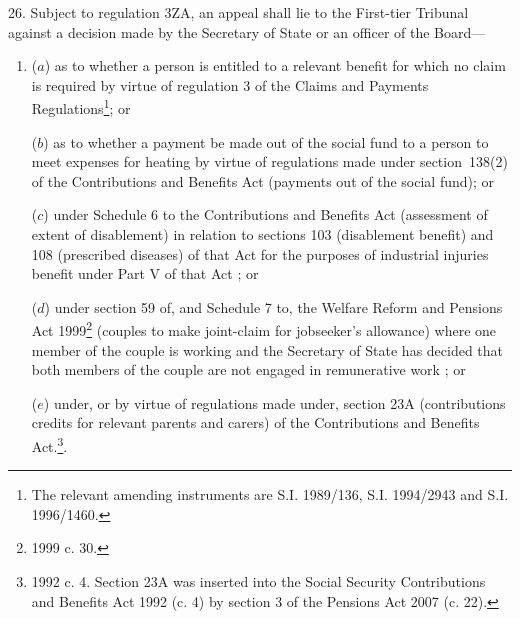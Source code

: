 \documentclass[12pt,a4paper]{article}
\begin{document}
26.  
Subject to regulation 3ZA,  %
an appeal shall lie to
the First-tier Tribunal  %
against a decision made by the Secretary of State
or an officer of the Board—  %
\begin{enumerate}\item[]
($a$) as to whether a person is entitled to a relevant benefit for which no claim is required by virtue of regulation 3 of the Claims and Payments Regulations\footnote{\frenchspacing The relevant amending instruments are S.I. 1989/136, S.I. 1994/2943 and S.I. 1996/1460.}; or

($b$) as to whether a payment be made out of the social fund to a person to meet expenses for heating by virtue of regulations made under section~138(2) of the Contributions and Benefits Act (payments out of the social fund);
or

($c$) under Schedule 6 to the Contributions and Benefits Act (assessment of extent of disablement) in relation to sections 103 (disablement benefit) and 108 (prescribed diseases) of that Act for the purposes of industrial injuries benefit under Part V of that Act%
; or

    ($d$) 
    under section 59 of, and Schedule 7 to, the Welfare Reform and Pensions Act 1999\footnote{1999 c. 30.} (couples to make joint-claim for jobseeker’s allowance) where one member of the couple is working and the Secretary of State has decided that both members of the couple are not engaged in remunerative work%
; or

($e$) under, or by virtue of regulations made under, section 23A (contributions credits for relevant parents and carers) of the Contributions and Benefits Act.\footnote{1992 c. 4. Section 23A was inserted into the Social Security Contributions and Benefits Act 1992 (c. 4) by section 3 of the Pensions Act 2007 (c. 22).}.
\end{enumerate}

\end{document}
